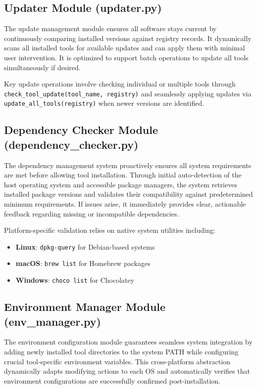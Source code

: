 \documentclass[12pt,a4paper]{report}
\begin{document}
\subsection{Updater Module (updater.py)}
The update management module ensures all software stays current by continuously comparing installed versions against registry records. It dynamically scans all installed tools for available updates and can apply them with minimal user intervention. It is optimized to support batch operations to update all tools simultaneously if desired.

Key update operations involve checking individual or multiple tools through \texttt{check\_tool\_update(tool\_name, registry)} and seamlessly applying updates via \texttt{update\_all\_tools(registry)} when newer versions are identified.

\subsection{Dependency Checker Module (dependency\_checker.py)}
The dependency management system proactively ensures all system requirements are met before allowing tool installation. Through initial auto-detection of the host operating system and accessible package managers, the system retrieves installed package versions and validates their compatibility against predetermined minimum requirements. If issues arise, it immediately provides clear, actionable feedback regarding missing or incompatible dependencies.

Platform-specific validation relies on native system utilities including:
\begin{itemize}
    \item \textbf{Linux}: \texttt{dpkg-query} for Debian-based systems
    \item \textbf{macOS}: \texttt{brew list} for Homebrew packages
    \item \textbf{Windows}: \texttt{choco list} for Chocolatey
\end{itemize}

\subsection{Environment Manager Module (env\_manager.py)}
The environment configuration module guarantees seamless system integration by adding newly installed tool directories to the system PATH while configuring crucial tool-specific environment variables. This cross-platform abstraction dynamically adapts modifying actions to each OS and automatically verifies that environment configurations are successfully confirmed post-installation.
\end{document}
